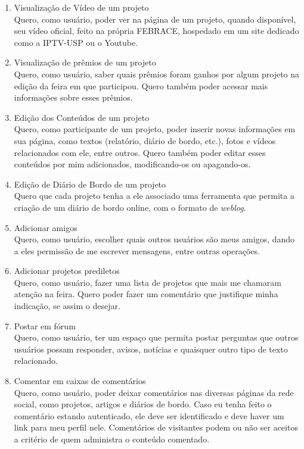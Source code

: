 \begin{enumerate}
      \item Visualização de Vídeo de um projeto \\
        Quero, como usuário, poder ver na página de um projeto, quando disponível, seu vídeo oficial, feito na própria FEBRACE, hospedado em um site dedicado como a IPTV-USP ou o Youtube.
      \item Visualização de prêmios de um projeto \\
        Quero, como usuário, saber quais prêmios foram ganhos por algum projeto na edição da feira em que participou. Quero também poder acessar mais informações sobre esses prêmios.
      \item Edição dos Conteúdos de um projeto \\
        Quero, como participante de um projeto, poder inserir novas informações em sua página, como textos (relatório, diário de bordo, etc.), fotos e vídeos relacionados com ele, entre outros. Quero também poder editar esses conteúdos por mim adicionados, modificando-os ou apagando-os.
      \item Edição de Diário de Bordo de um projeto \\
        Quero que cada projeto tenha a ele associado uma ferramenta que permita a criação de um diário de bordo online, com o formato de \textit{weblog}.
      \item Adicionar amigos \\
        Quero, como usuário, escolher quais outros usuários são meus amigos, dando a eles permissão de me escrever mensagens, entre outras operações.
      \item Adicionar projetos prediletos \\
        Quero, como usuário, fazer uma lista de projetos que mais me chamaram atenção na feira. Quero poder fazer um comentário que justifique minha indicação, se assim o desejar.
      \item Postar em fórum \\
        Quero, como usuário, ter um espaço que permita postar perguntas que outros usuários possam responder, avisos, notícias e quaisquer outro tipo de texto relacionado.
      \item Comentar em caixas de comentários \\
        Quero, como usuário, poder deixar comentários nas diversas páginas da rede social, como projetos, artigos e diários de bordo. Caso eu tenha feito o comentário estando autenticado, ele deve ser identificado e deve haver um link para meu perfil nele. Comentários de visitantes podem ou não ser aceitos a critério de quem administra o conteúdo comentado.

\end{enumerate}
